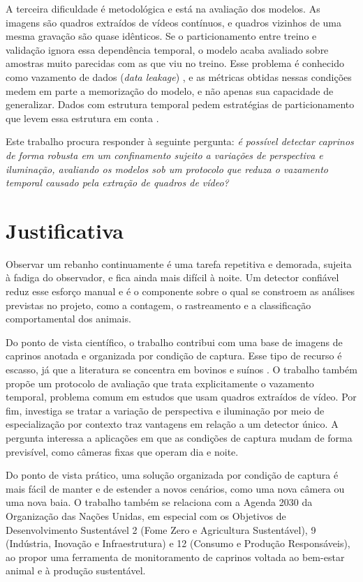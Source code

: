 A terceira dificuldade é metodológica e está na avaliação dos modelos. As imagens são quadros extraídos de vídeos contínuos, e quadros vizinhos de uma mesma gravação são quase idênticos. Se o particionamento entre treino e validação ignora essa dependência temporal, o modelo acaba avaliado sobre amostras muito parecidas com as que viu no treino. Esse problema é conhecido como vazamento de dados (\textit{data leakage}) \cite{kaufman2012leakage}, e as métricas obtidas nessas condições medem em parte a memorização do modelo, e não apenas sua capacidade de generalizar. Dados com estrutura temporal pedem estratégias de particionamento que levem essa estrutura em conta \cite{roberts2017crossvalidation}.

Este trabalho procura responder à seguinte pergunta: \textit{é possível detectar caprinos de forma robusta em um confinamento sujeito a variações de perspectiva e iluminação, avaliando os modelos sob um protocolo que reduza o vazamento temporal causado pela extração de quadros de vídeo?}

\section{Justificativa}
\label{sec:justificativa}

Observar um rebanho continuamente é uma tarefa repetitiva e demorada, sujeita à fadiga do observador, e fica ainda mais difícil à noite. Um detector confiável reduz esse esforço manual e é o componente sobre o qual se constroem as análises previstas no projeto, como a contagem, o rastreamento e a classificação comportamental dos animais.

Do ponto de vista científico, o trabalho contribui com uma base de imagens de caprinos anotada e organizada por condição de captura. Esse tipo de recurso é escasso, já que a literatura se concentra em bovinos e suínos \cite{nasirahmadi2017, rohan2023deep_livestock_survey}. O trabalho também propõe um protocolo de avaliação que trata explicitamente o vazamento temporal, problema comum em estudos que usam quadros extraídos de vídeo. Por fim, investiga se tratar a variação de perspectiva e iluminação por meio de especialização por contexto traz vantagens em relação a um detector único. A pergunta interessa a aplicações em que as condições de captura mudam de forma previsível, como câmeras fixas que operam dia e noite.

Do ponto de vista prático, uma solução organizada por condição de captura é mais fácil de manter e de estender a novos cenários, como uma nova câmera ou uma nova baia. O trabalho também se relaciona com a Agenda 2030 da Organização das Nações Unidas, em especial com os Objetivos de Desenvolvimento Sustentável 2 (Fome Zero e Agricultura Sustentável), 9 (Indústria, Inovação e Infraestrutura) e 12 (Consumo e Produção Responsáveis), ao propor uma ferramenta de monitoramento de caprinos voltada ao bem-estar animal e à produção sustentável.

